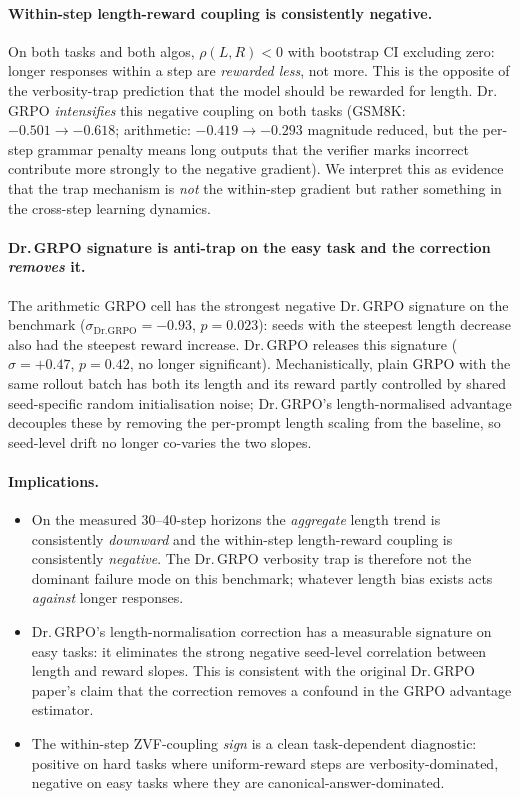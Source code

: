 \paragraph{Within-step length-reward coupling is consistently negative.}
On both tasks and both algos, $\rho(L, R) < 0$ with bootstrap CI excluding
zero: longer responses within a step are \emph{rewarded less}, not more.
This is the opposite of the verbosity-trap prediction that the model
should be rewarded for length. Dr.\,GRPO \emph{intensifies} this negative
coupling on both tasks (GSM8K: $-0.501 \to -0.618$; arithmetic:
$-0.419 \to -0.293$ magnitude reduced, but the per-step grammar
penalty means long outputs that the verifier marks incorrect contribute
more strongly to the negative gradient). We interpret this as evidence
that the trap mechanism is \emph{not} the within-step gradient but
rather something in the cross-step learning dynamics.

\paragraph{Dr.\,GRPO signature is anti-trap on the easy task and the
correction \emph{removes} it.}
The arithmetic GRPO cell has the strongest negative Dr.\,GRPO signature
on the benchmark ($\sigma_{\mathrm{Dr.GRPO}} = -0.93$, $p = 0.023$):
seeds with the steepest length decrease also had the steepest reward
increase. Dr.\,GRPO releases this signature ($\sigma = +0.47$, $p = 0.42$,
no longer significant). Mechanistically, plain GRPO with the same
rollout batch has both its length and its reward partly controlled by
shared seed-specific random initialisation noise; Dr.\,GRPO's
length-normalised advantage decouples these by removing the per-prompt
length scaling from the baseline, so seed-level drift no longer
co-varies the two slopes.

\paragraph{Implications.}
\begin{itemize}
\item On the measured 30--40-step horizons the \emph{aggregate} length
  trend is consistently \emph{downward} and the within-step length-reward
  coupling is consistently \emph{negative}. The Dr.\,GRPO verbosity trap
  is therefore not the dominant failure mode on this benchmark;
  whatever length bias exists acts \emph{against} longer responses.
\item Dr.\,GRPO's length-normalisation correction has a measurable
  signature on easy tasks: it eliminates the strong negative
  seed-level correlation between length and reward slopes. This is
  consistent with the original Dr.\,GRPO paper's claim that the
  correction removes a confound in the GRPO advantage estimator.
\item The within-step ZVF-coupling \emph{sign} is a clean task-dependent
  diagnostic: positive on hard tasks where uniform-reward steps are
  verbosity-dominated, negative on easy tasks where they are
  canonical-answer-dominated.
\end{itemize}

